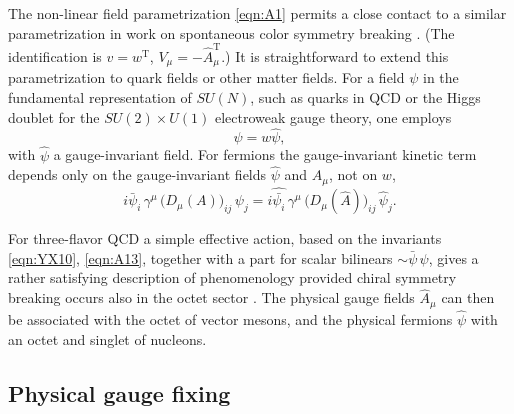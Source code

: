 \documentclass[twocolumn,aps,prd,amsmath,amssymb,preprintnumbers,longbibliography]{revtex4-1}
\numberwithin{equation}{section}
\newcommand{\transp}{\mathrm{T}}
\begin{document}
\begin{appendices}
The non-linear field parametrization \eqref{eqn:A1} permits a close contact to a similar parametrization in work on spontaneous color symmetry breaking \cite{CWSBC,CWHP}. (The identification is $v = w^\transp$, $V_\mu = -\hat{A}_\mu^\transp$.) It is straightforward to extend this parametrization to quark fields or other matter fields. For a field $\psi$ in the fundamental representation of $SU(N)$, such as quarks in QCD or the Higgs doublet for the $SU(2) \times U(1)$ electroweak gauge theory, one employs
\begin{equation}\label{eqn:A12}
	\psi
	= w \hat\psi,
\end{equation}
with $\hat\psi$ a gauge-invariant field. For fermions the gauge-invariant kinetic term depends only on the gauge-invariant fields $\hat\psi$ and $\hat{A}_\mu$, not on $w$,
\begin{equation}\label{eqn:A13}
	i \bar\psi_i \, \gamma^\mu \, \bigl(D_\mu(A)\bigr)_{ij} \, \psi_j
	= i \hat{\bar{\psi_i}} \, \gamma^\mu \, \bigl(D_\mu(\hat{A})\bigr)_{ij} \, \hat\psi_j.
\end{equation}

For three-flavor QCD a simple effective action, based on the invariants \eqref{eqn:YX10}, \eqref{eqn:A13}, together with a part for scalar bilinears $\sim \bar\psi \, \psi$, gives a rather satisfying description of phenomenology provided chiral symmetry breaking occurs also in the octet sector \cite{CWSBC}. The physical gauge fields $\hat{A}_\mu$ can then be associated with the octet of vector mesons, and the physical fermions $\hat\psi$ with an octet and singlet of nucleons.


\subsection{Physical gauge fixing}
\label{app:physical gauge fixing}


\end{appendices}
\end{document}
